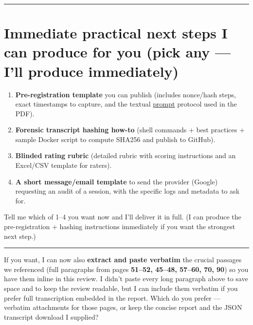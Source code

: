 \documentclass{article}
\begin{document}
\begin{center}\rule{0.5\linewidth}{0.5pt}\end{center}

\section*{Immediate practical next steps I can produce for you (pick any --- I'll produce immediately)}\label{immediate-practical-next-steps-i-can-produce-for-you-pick-any-ill-produce-immediately}

\begin{enumerate}
\item
  \textbf{Pre-registration template} you can publish (includes nonce/hash steps, exact timestamps to capture, and the textual \hyperlink{gloss:prompt}{prompt} protocol used in the PDF).
\item
  \textbf{Forensic transcript hashing how-to} (shell commands + best practices + sample Docker script to compute SHA256 and publish to GitHub).
\item
  \textbf{Blinded rating rubric} (detailed rubric with scoring instructions and an Excel/CSV template for raters).
\item
  \textbf{A short message/email template} to send the provider (Google) requesting an audit of a session, with the specific logs and metadata to ask for.
\end{enumerate}

Tell me which of 1--4 you want now and I'll deliver it in full. (I can produce the pre-registration + hashing instructions immediately if you want the strongest next step.)

\begin{center}\rule{0.5\linewidth}{0.5pt}\end{center}

If you want, I can now also \textbf{extract and paste verbatim} the crucial passages we referenced (full paragraphs from pages \textbf{51--52, 45--48, 57--60, 70, 90}) so you have them inline in this review. I didn't paste every long paragraph above to save space and to keep the review readable, but I can include them verbatim if you prefer full transcription embedded in the report. Which do you prefer --- verbatim attachments for those pages, or keep the concise report and the JSON transcript download I supplied?
\end{document}

